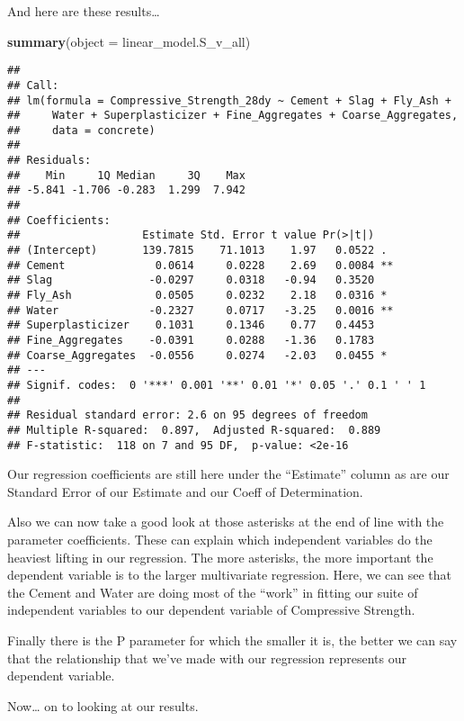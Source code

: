 \documentclass[]{article}
\newenvironment{Shaded}{\begin{snugshade}}{\end{snugshade}}
\newcommand{\DataTypeTok}[1]{\textcolor[rgb]{0.13,0.29,0.53}{#1}}
\newcommand{\KeywordTok}[1]{\textcolor[rgb]{0.13,0.29,0.53}{\textbf{#1}}}
\newcommand{\NormalTok}[1]{#1}
\begin{document}
And here are these results\ldots{}

\begin{Shaded}
\begin{Highlighting}[]
\KeywordTok{summary}\NormalTok{(}\DataTypeTok{object =}\NormalTok{ linear_model.S_v_all)}
\end{Highlighting}
\end{Shaded}

\begin{verbatim}
## 
## Call:
## lm(formula = Compressive_Strength_28dy ~ Cement + Slag + Fly_Ash + 
##     Water + Superplasticizer + Fine_Aggregates + Coarse_Aggregates, 
##     data = concrete)
## 
## Residuals:
##    Min     1Q Median     3Q    Max 
## -5.841 -1.706 -0.283  1.299  7.942 
## 
## Coefficients:
##                   Estimate Std. Error t value Pr(>|t|)   
## (Intercept)       139.7815    71.1013    1.97   0.0522 . 
## Cement              0.0614     0.0228    2.69   0.0084 **
## Slag               -0.0297     0.0318   -0.94   0.3520   
## Fly_Ash             0.0505     0.0232    2.18   0.0316 * 
## Water              -0.2327     0.0717   -3.25   0.0016 **
## Superplasticizer    0.1031     0.1346    0.77   0.4453   
## Fine_Aggregates    -0.0391     0.0288   -1.36   0.1783   
## Coarse_Aggregates  -0.0556     0.0274   -2.03   0.0455 * 
## ---
## Signif. codes:  0 '***' 0.001 '**' 0.01 '*' 0.05 '.' 0.1 ' ' 1
## 
## Residual standard error: 2.6 on 95 degrees of freedom
## Multiple R-squared:  0.897,  Adjusted R-squared:  0.889 
## F-statistic:  118 on 7 and 95 DF,  p-value: <2e-16
\end{verbatim}

Our regression coefficients are still here under the ``Estimate'' column
as are our Standard Error of our Estimate and our Coeff of
Determination.

Also we can now take a good look at those asterisks at the end of line
with the parameter coefficients. These can explain which independent
variables do the heaviest lifting in our regression. The more asterisks,
the more important the dependent variable is to the larger multivariate
regression. Here, we can see that the Cement and Water are doing most of
the ``work'' in fitting our suite of independent variables to our
dependent variable of Compressive Strength.

Finally there is the P parameter for which the smaller it is, the better
we can say that the relationship that we've made with our regression
represents our dependent variable.

Now\ldots{} on to looking at our results.
\end{document}
